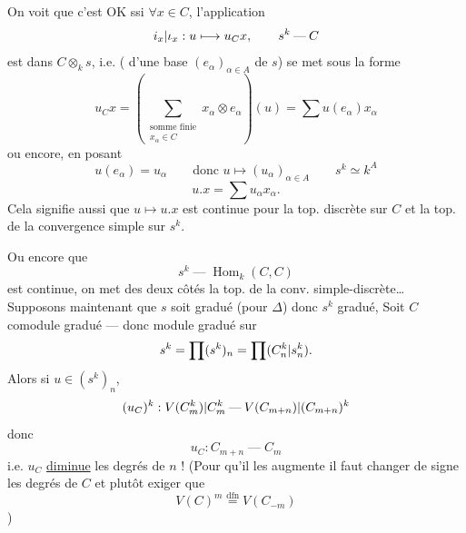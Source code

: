 On voit que c'est OK ssi $\forall x\in C$, l'application
\[
 {i_x|\iota_x}:u\longmapsto u_Cx,\qquad s^k\mathbin{\text{---}}C
\]
est dans $C\otimes_k s$,  i.e. ( d'une base $(e_\alpha)_{\alpha\in A}$ de $s$) se met sous la forme
\[
 u_Cx=\left(\sum_{\substack{\text{somme finie}\\x_\alpha\in C}}x_\alpha\otimes e_\alpha\right)(u)
 =\sum u(e_\alpha)x_\alpha
\]
ou encore, en posant
\[
 u(e_\alpha)=u_\alpha\qquad\text{donc }u\longmapsto(u_\alpha)_{\alpha\in A}\qquad s^k\simeq k^A
\]
\[
 u.x=\sum u_\alpha x_\alpha.
\]
Cela signifie aussi que $u\longmapsto u.x$ est continue pour la top. discrète sur $C$ et la top. de la convergence simple sur $s^k$.

Ou encore que
\[
 s^k\mathbin{\text{---}}\operatorname{Hom}_k(C,C)
\]
est continue,  on met des deux côtés la top. de la conv. simple-discrète\ldots
{}
Supposons maintenant que $s$ soit gradué
(pour $\Delta$) donc $s^k$ gradué,
Soit $C$ comodule gradué --- donc
module gradué sur
\[
 s^k=\prod(s^k)_n=\prod({C_n^k|s_n^k}).
\]
Alors  si $u\in(s^k)_n$,
\[
 (u_C)^k:{V(C_m^k)|C_m^k}\mathbin{\text{---}}{V(C_{m+n})|(C_{m+n})^k}
\]
donc
\[
 u_C:C_{m+n}\mathbin{\text{---}}C_m
\]
i.e. $u_C$ \uline{diminue} les degrés de $n$ ! (Pour qu'il les augmente il faut changer de signe les degrés de $C$ et plutôt exiger que
\[
 V(C)^m\overset{\mathrm{dfn}}=V(C_{-m})
\]
\unsure{---})
